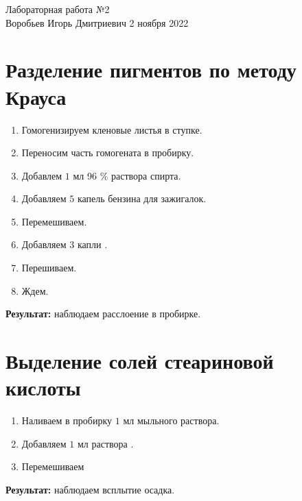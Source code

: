 \documentclass[12pt, letterpaper, twoside]{article}
\begin{document}
\begin{center}
	\LARGE{Лабораторная работа №2}\\[0.2cm]
	\large{Воробьев Игорь Дмитриевич}
	\large{2 ноября 2022}
\end{center}

\section{Разделение пигментов по методу Крауса}
\begin{enumerate}
	\item Гомогенизируем кленовые листья в ступке.
	\item Переносим часть гомогената в пробирку.
	\item Добавлем $1$ мл 96 \% раствора спирта.
	\item Добавляем $5$ капель бензина для зажигалок.
	\item Перемешиваем.
	\item Добавляем $3$ капли .
	\item Перешиваем.
	\item Ждем.
\end{enumerate}
\textbf{Результат:} наблюдаем расслоение в пробирке.

\section{Выделение солей стеариновой кислоты}
\begin{enumerate}
	\item Наливаем в пробирку $1$ мл мыльного раствора.
	\item Добавляем $1$ мл раствора .
	\item Перемешиваем
\end{enumerate}
\textbf{Результат:} наблюдаем всплытие осадка.
\end{document}
